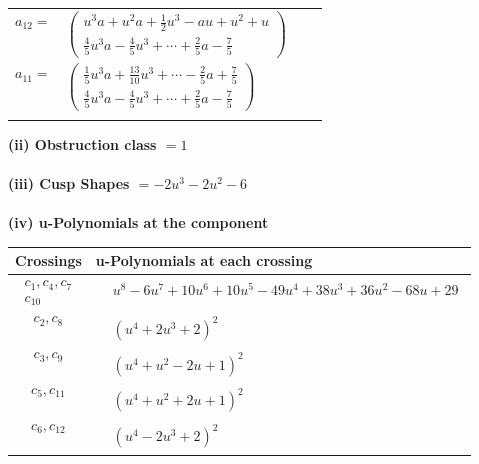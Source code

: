\documentclass[1p]{elsarticle_modified}
\theoremstyle{definition}
\begin{document}
\begin{tabular}{m{7pt} m{180pt} m{7pt} m{180pt} }
\flushright $a_{12}=$&$\begin{pmatrix}u^3 a+u^2 a+\frac{1}{2} u^3- a u+u^2+u\\\frac{4}{5} u^3 a-\frac{4}{5} u^3+\cdots+\frac{2}{5} a-\frac{7}{5}\end{pmatrix}$ \\
\flushright $a_{11}=$&$\begin{pmatrix}\frac{1}{5} u^3 a+\frac{13}{10} u^3+\cdots-\frac{2}{5} a+\frac{7}{5}\\\frac{4}{5} u^3 a-\frac{4}{5} u^3+\cdots+\frac{2}{5} a-\frac{7}{5}\end{pmatrix}$\\&\end{tabular}
\flushleft \textbf{(ii) Obstruction class $= 1$}\\~\\
\flushleft \textbf{(iii) Cusp Shapes $= -2 u^3-2 u^2-6$}\\~\\
\newpage\renewcommand{\arraystretch}{1}
\flushleft \textbf{(iv) u-Polynomials at the component}\newline \\
\begin{tabular}{m{50pt}|m{274pt}}
Crossings & \hspace{64pt}u-Polynomials at each crossing \\
\hline $$\begin{aligned}c_{1},c_{4},c_{7}\\c_{10}\end{aligned}$$&$\begin{aligned}
&u^8-6 u^7+10 u^6+10 u^5-49 u^4+38 u^3+36 u^2-68 u+29
\end{aligned}$\\
\hline $$\begin{aligned}c_{2},c_{8}\end{aligned}$$&$\begin{aligned}
&(u^4+2 u^3+2)^2
\end{aligned}$\\
\hline $$\begin{aligned}c_{3},c_{9}\end{aligned}$$&$\begin{aligned}
&(u^4+u^2-2 u+1)^2
\end{aligned}$\\
\hline $$\begin{aligned}c_{5},c_{11}\end{aligned}$$&$\begin{aligned}
&(u^4+u^2+2 u+1)^2
\end{aligned}$\\
\hline $$\begin{aligned}c_{6},c_{12}\end{aligned}$$&$\begin{aligned}
&(u^4-2 u^3+2)^2
\end{aligned}$\\
\hline
\end{tabular}\\~\\
\end{document}
